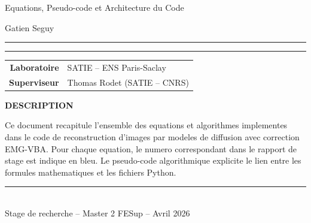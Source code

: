 \documentclass[12pt]{article}
\begin{document}
\begin{titlepage}
\begin{center}
    {\Large Equations, Pseudo-code et Architecture du Code}

    \vspace{0.35cm}

    {\Huge Gatien Seguy}

    \vspace{0.35cm}

    {\color{black}\rule{0.9\textwidth}{0.8pt}}
    {\color{black}\rule{1\textwidth}{1.2pt}}

    \vspace{0.5cm}

    \renewcommand{\arraystretch}{1.5}
    \begin{tabular}{r@{\hspace{0.8em}:\hspace{0.8em}}l}
    \textbf{Laboratoire }  & SATIE -- ENS Paris-Saclay\\
    \textbf{Superviseur}    & Thomas Rodet (SATIE -- CNRS)\\
    \end{tabular}
    \renewcommand{\arraystretch}{1}

    \vspace{0.3cm}
    \begin{center}
    \textbf{DESCRIPTION}
    \end{center}
    \begin{minipage}{0.88\textwidth}\small
    Ce document recapitule l'ensemble des equations et algorithmes implementes dans le code
    de reconstruction d'images par modeles de diffusion avec correction EMG-VBA. Pour chaque
    equation, le numero correspondant dans le rapport de stage est indique en bleu. Le pseudo-code
    algorithmique explicite le lien entre les formules mathematiques et les fichiers Python.
    \end{minipage}
    \vfill
\end{center}
\vfill
\begin{center}
    {\color{sectioncolor}\rule{0.3\textwidth}{0.4pt}}\\[0.35cm]
    {\small\color{proofgray} Stage de recherche -- Master 2 FESup -- Avril 2026}
\end{center}
\vspace*{-1.5cm}
\end{titlepage}

\setcounter{page}{2}\newpage\vspace*{0.5cm}\tableofcontents\newpage


\end{document}
